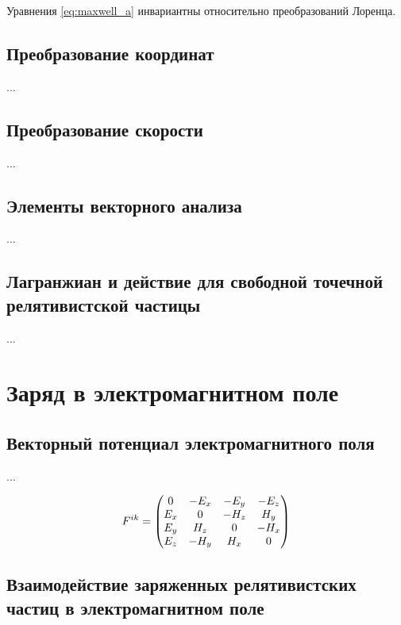 \documentclass{article}
\begin{document}
Уравнения \eqref{eq:maxwell_a} инвариантны относительно преобразований Лоренца.

\subsection{Преобразование координат}

...

\subsection{Преобразование скорости}

...

\subsection{Элементы векторного анализа}

...

\subsection{Лагранжиан и действие для свободной точечной релятивистской частицы}

...

\section{Заряд в электромагнитном поле}

\subsection{Векторный потенциал электромагнитного поля}

...

\begin{equation}\label{eq:fmatrix}
    \tensor{F}{^i^k} =
    \begin{pmatrix}
        0 & -E_x & -E_y & -E_z \\
        E_x & 0 & -H_z & H_y \\
        E_y & H_z & 0 & -H_x \\
        E_z & -H_y & H_x & 0
    \end{pmatrix}
\end{equation}

\subsection{Взаимодействие заряженных релятивистских частиц в электромагнитном поле}
\end{document}
